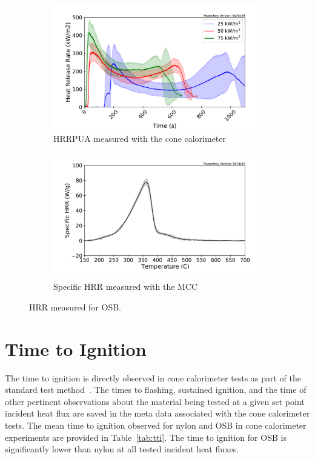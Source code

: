 \documentclass[12pt,oneside]{book}
\begin{document}
\begin{figure}[H]
    \centering
    \begin{subfigure}[b]{0.49\textwidth}
        \centering
        \includegraphics[width=\textwidth]{Figures/OSB_Cone_HRRPUA_Mean.pdf}
        \caption{HRRPUA measured with the cone calorimeter}
    \end{subfigure}
    \hfill
    \begin{subfigure}[b]{0.49\textwidth}
        \centering
        \includegraphics[width=\textwidth]{Figures/OSB_MCC.pdf}
        \caption{Specific HRR measured with the MCC}
    \end{subfigure}
    \caption[HRR Measured for OSB] {HRR measured for OSB.} 
    \label{fig:OSB_hrr}
\end{figure}

\section{Time to Ignition}

The time to ignition is directly observed in cone calorimeter tests as part of the standard test method~\cite{ASTM_E1354}. The times to flashing, sustained ignition, and the time of other pertinent observations about the material being tested at a given set point incident heat flux are saved in the meta data associated with the cone calorimeter tests. The mean time to ignition observed for nylon and OSB in cone calorimeter experiments are provided in Table~\ref{tab:tti}. The time to ignition for OSB is significantly lower than nylon at all tested incident heat fluxes.
\end{document}
